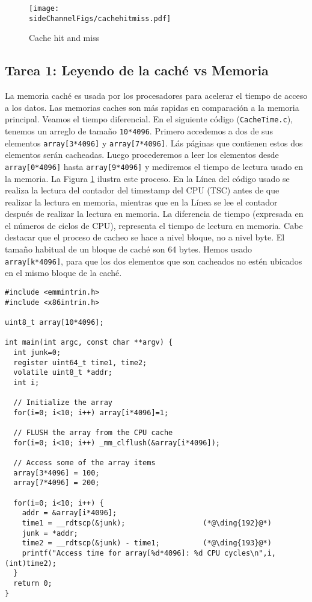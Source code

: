 \begin{figure}[htb]
\centering
\texttt{[image: \\sideChannelFigs/cachehitmiss.pdf]}
\caption{Cache hit and miss}
\label{sidechannel:fig:cachehitmiss}
\end{figure}


\subsection{Tarea 1: Leyendo de la caché vs Memoria }

La memoria caché es usada por los procesadores para acelerar el tiempo de acceso a los datos. Las memorias caches son más rapidas en comparación a la memoria principal.
Veamos el tiempo diferencial. En el siguiente código (\texttt{CacheTime.c}), tenemos un arreglo de tamaño \texttt{10*4096}. Primero accedemos a dos de sus elementos \texttt{array[3*4096]} y \texttt{array[7*4096]}. Lás páginas que contienen estos dos elementos serán cacheadas. Luego procederemos a leer los elementos desde \texttt{array[0*4096]} hasta \texttt{array[9*4096]} y mediremos el tiempo de lectura usado en la memoria.
La Figura \ref{sidechannel:fig:cachehitmiss} ilustra este proceso.
En la Línea  del código usado se realiza la lectura del contador del timestamp del CPU (TSC) antes de que realizar la lectura en memoria, mientras que en la Línea  se lee el contador después de realizar la lectura en memoria. La diferencia de tiempo (expresada en el números de ciclos de CPU), representa el tiempo de lectura en memoria.
Cabe destacar que el proceso de cacheo se hace a nivel bloque, no a nivel byte. El tamaño habitual de un bloque de caché son 64 bytes. Hemos usado \texttt{array[k*4096]}, para que los dos elementos que son cacheados no estén ubicados en el mismo bloque de la caché. 


\begin{lstlisting}[caption=\texttt{CacheTime.c}]
#include <emmintrin.h>
#include <x86intrin.h>

uint8_t array[10*4096];

int main(int argc, const char **argv) {
  int junk=0;
  register uint64_t time1, time2;
  volatile uint8_t *addr;
  int i;
  
  // Initialize the array
  for(i=0; i<10; i++) array[i*4096]=1;

  // FLUSH the array from the CPU cache
  for(i=0; i<10; i++) _mm_clflush(&array[i*4096]);

  // Access some of the array items
  array[3*4096] = 100;
  array[7*4096] = 200;

  for(i=0; i<10; i++) {
    addr = &array[i*4096];
    time1 = __rdtscp(&junk);                  (*@\ding{192}@*)
    junk = *addr;
    time2 = __rdtscp(&junk) - time1;          (*@\ding{193}@*)
    printf("Access time for array[%d*4096]: %d CPU cycles\n",i, (int)time2);
  }
  return 0;
}
\end{lstlisting}


